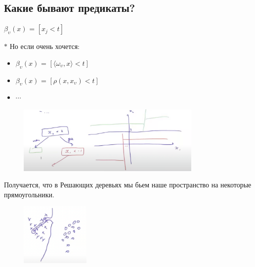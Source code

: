     \subsection{Какие бывают предикаты?}

        \begin{center}
            $\beta_\upsilon(x)$ = $[x_j < t]$
        \end{center}
        $\ast$ Но если очень хочется:
        \begin{itemize}
            \item $\beta_\upsilon(x)$ = $[\langle\omega_\upsilon, x\rangle < t]$

            \item $\beta_\upsilon(x)$ = $[\rho(x, x_\upsilon) < t]$

            \item $\cdots$
        \end{itemize}

        \begin{figure}[H]
            \centering
            \includegraphics[width=0.8\textwidth]{images/8lecture/DecisionTreeExample.png}
        \end{figure}
        Получается, что в Решающих деревьях мы бьем наше пространство на некоторые прямоугольники.\\


        \begin{figure}[H]
            \centering
            \includegraphics[width=0.3\textwidth]{images/8lecture/overfittDecTree.png}
        \end{figure}


